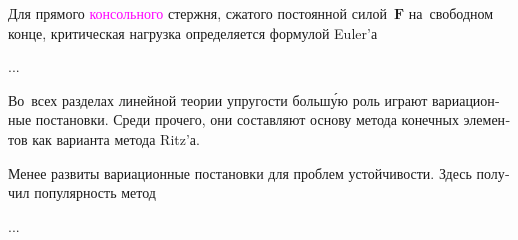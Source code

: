 

\label{section:additionalpliabilities}

\begin{otherlanguage}{russian}

Для прямого \textcolor{magenta}{консольного} стержня, сжатого постоянной силой~$\bm{F}$ на~свободном конце, критическая нагрузка определяется формулой Euler’а

...



\end{otherlanguage}



\label{section:variationalformulationsforstability}

\begin{otherlanguage}{russian}

Во~всех разделах линейной теории упругости больш\'{у}ю роль играют вариационные постановки.
Среди прочего, они составляют основу метода конечных элементов как варианта метода Ritz’а.

Менее развиты вариационные постановки для проблем устойчивости.
Здесь получил популярность метод

...



\end{otherlanguage}



